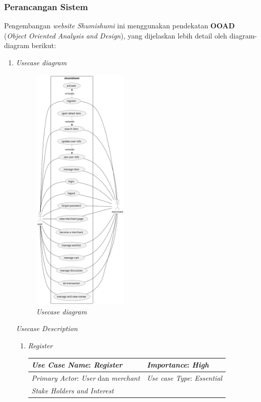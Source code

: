 \documentclass[a4paper]{article}
\newcommand{\subsubbab}[1]{%
    \subsubsection{#1}%
}
\begin{document}
\subsubbab{Perancangan Sistem}
Pengembangan \textit{website Shumishumi} ini menggunakan pendekatan \textbf{OOAD} (\textit{Object Oriented Analysis and Design}), yang dijelaskan lebih detail oleh diagram-diagram berikut:
\newpage
\begin{enumerate}
    \item \textit{Usecase diagram}
    \begin{figure}[h]
        \centering
        \includegraphics*[height=12cm]{diagram/usecase diagram/usecase diagram.png}
        \caption{\textit{Usecase diagram}}
    \end{figure}
    \newpage
    \textit{Usecase Description}
    \begin{enumerate}
        \item \textit{Register}\\
        \begin{table}[h]
            \centering
            \begin{tabular}{|lll}
            \hline
            \multicolumn{1}{|l|}{\textit{Use Case Name}: \textit{Register}}             & \multicolumn{2}{l|}{\textit{Importance}: \textit{High}}   \\ \hline
            \multicolumn{1}{|l|}{\textit{Primary Actor}: \textit{User} dan \textit{merchant}}             & \multicolumn{2}{l|}{\textit{Use case Type}: \textit{Essential}} \\ \hline
            \multicolumn{1}{|l|}{\textit{Stake Holders and Interest}} &                               &                               \\ \cline{1-1}

\end{tabular}
\end{table}
\end{enumerate}
\end{enumerate}
\end{document}

